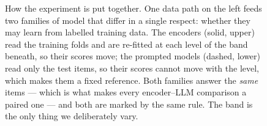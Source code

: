\begin{figure}[t]
\caption{How the experiment is put together. One data path on the left feeds two
families of model that differ in a single respect: whether they may learn from
labelled training data. The encoders (solid, upper) read the training folds and
are re-fitted at each level of the band beneath, so their scores move; the
prompted models (dashed, lower) read only the test items, so their scores cannot
move with the level, which makes them a fixed reference. Both families answer the
\emph{same} items --- which is what makes every encoder--LLM comparison a paired
one --- and both are marked by the same rule. The band is the only thing we
deliberately vary.}
\label{fig:arch}
\end{figure}
